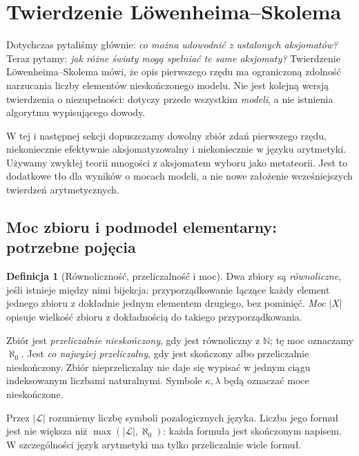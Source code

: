 \documentclass[11pt,a4paper]{article}
\numberwithin{equation}{section}
\theoremstyle{plain}
\theoremstyle{definition}
\newtheorem{definicja}[twierdzenie]{Definicja}
\theoremstyle{remark}
\begin{document}
\section{Twierdzenie Löwenheima--Skolema}\label{sec:loewenheim-skolem}
Dotychczas pytaliśmy głównie: \emph{co można udowodnić z ustalonych aksjomatów?} Teraz pytamy: \emph{jak różne światy mogą spełniać te same aksjomaty?} Twierdzenie Löwenheima--Skolema mówi, że opis pierwszego rzędu ma ograniczoną zdolność narzucania liczby elementów nieskończonego modelu. Nie jest kolejną wersją twierdzenia o niezupełności: dotyczy przede wszystkim \emph{modeli}, a nie istnienia algorytmu wypisującego dowody.

W tej i następnej sekcji dopuszczamy dowolny zbiór zdań pierwszego rzędu, niekoniecznie efektywnie aksjomatyzowalny i niekoniecznie w języku arytmetyki. Używamy zwykłej teorii mnogości z aksjomatem wyboru jako metateorii. Jest to dodatkowe tło dla wyników o mocach modeli, a nie nowe założenie wcześniejszych twierdzeń arytmetycznych.

\subsection*{Moc zbioru i podmodel elementarny: potrzebne pojęcia}\label{sec:14:1}
\begin{definicja}[Równoliczność, przeliczalność i moc]\label{res:14:1}
Dwa zbiory są \emph{równoliczne}, jeśli istnieje między nimi bijekcja: przyporządkowanie łączące każdy element jednego zbioru z dokładnie jednym elementem drugiego, bez pominięć. \emph{Moc} $|X|$ opisuje wielkość zbioru z dokładnością do takiego przyporządkowania.

Zbiór jest \emph{przeliczalnie nieskończony}, gdy jest równoliczny z $\mathbb N$; tę moc oznaczamy $\aleph_0$. Jest \emph{co najwyżej przeliczalny}, gdy jest skończony albo przeliczalnie nieskończony. Zbiór nieprzeliczalny nie daje się wypisać w jednym ciągu indeksowanym liczbami naturalnymi. Symbole $\kappa,\lambda$ będą oznaczać moce nieskończone.

Przez $|\mathcal L|$ rozumiemy liczbę symboli pozalogicznych języka. Liczba jego formuł jest nie większa niż $\max(|\mathcal L|,\aleph_0)$: każda formuła jest skończonym napisem. W szczególności język arytmetyki ma tylko przeliczalnie wiele formuł.
\end{definicja}
\end{document}
